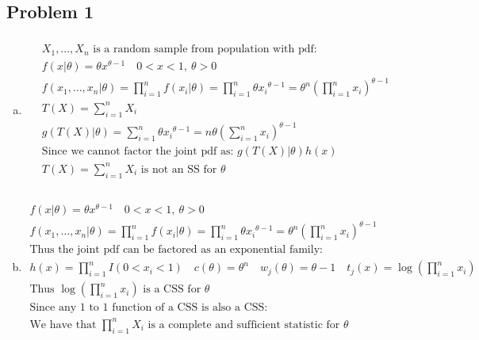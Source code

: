\documentclass{article}
\begin{document}
\begin{flushleft}

	\section*{Problem 1}
	
\begin{enumerate}[(a)]
	
	\item 
\begin{multline*}\\
X_1,\dots,X_n \text{ is a random sample from population with pdf:}\\
f(x|\theta)=\theta x^{\theta-1} \quad 0<x<1, \ \theta>0\\
f(x_1,\dots,x_n|\theta)=\prod_{i=1}^{n}f(x_i|\theta)=\prod_{i=1}^{n}\theta {x_i}^{\theta-1}=\theta^n\left(\prod_{i=1}^{n} {x_i}\right)^{\theta-1}\\
T(X)=\sum_{i=1}^{n}X_i\\
g(T(X)|\theta)=\sum_{i=1}^{n}\theta {x_i}^{\theta-1}=n\theta \left(\sum_{i=1}^{n} {x_i}\right)^{\theta-1}\\
\text{Since we cannot factor the joint pdf as: } g(T(X)|\theta)h(x)\\
T(X)=\sum_{i=1}^{n}X_i \text{ is not an SS for } \theta\\
\end{multline*}

	\item 
\begin{multline*}\\
f(x|\theta)=\theta x^{\theta-1} \quad 0<x<1, \ \theta>0\\
f(x_1,\dots,x_n|\theta)=\prod_{i=1}^{n}f(x_i|\theta)=\prod_{i=1}^{n}\theta {x_i}^{\theta-1}=\theta^n\left(\prod_{i=1}^{n} {x_i}\right)^{\theta-1}\\
\text{Thus the joint pdf can be factored as an exponential family: }\\
h(x)=\prod_{i=1}^{n}I(0<x_i<1) \quad
c(\theta)=\theta^n \quad w_j(\theta)=\theta-1 \quad t_j(x)=\log\left(\prod_{i=1}^{n} {x_i}\right)\\ 
\text{Thus } \log\left(\prod_{i=1}^{n} {x_i}\right) \text{ is a CSS for } \theta\\
\text{Since any 1 to 1 function of a CSS is also a CSS:}\\
\text{We have that } \prod_{i=1}^{n}X_i \text{ is a complete and sufficient statistic for } \theta\\
\end{multline*}


\end{enumerate}
\end{flushleft}
\end{document}
